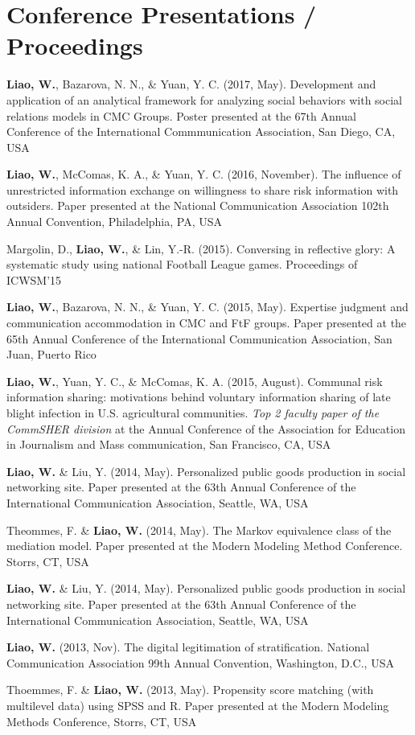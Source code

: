 \documentclass[11pt, letterpaper]{article} %
\newcommand{\years}[1]{\leavevmode\marginnote{\scriptsize #1}} %
\begin{document}
\section*{Conference Presentations / Proceedings}
\begin{hangparas}{.25in}{1}

    \textbf{Liao, W.}, \years{2017} Bazarova, N. N., \& Yuan, Y. C. (2017, May). Development and application of an analytical framework for analyzing social behaviors with social relations models in CMC Groups. Poster presented at the 67th Annual Conference of the International Commmunication Association, San Diego, CA, USA

    \textbf{Liao, W.}, \years{2016} McComas, K. A., \& Yuan, Y. C. (2016, November). The influence of unrestricted information exchange on willingness to share risk information with outsiders. Paper presented at the National Communication Association 102th Annual Convention, Philadelphia, PA, USA

    Margolin, D., \years{2015} \textbf{Liao, W.}, \& Lin, Y.-R. (2015). Conversing in reflective glory: A systematic study using national Football League games. Proceedings of ICWSM’15

    \textbf{Liao, W.}, Bazarova, N. N., \& Yuan, Y. C. (2015, May). Expertise judgment and communication accommodation in CMC and FtF groups. Paper presented at the 65th Annual Conference of the International Communication Association, San Juan, Puerto Rico

    \textbf{Liao, W.}, Yuan, Y. C., \& McComas, K. A. (2015, August). Communal risk information sharing: motivations behind voluntary information sharing of late blight infection in U.S. agricultural communities. \textsl{Top 2 faculty paper of the CommSHER division} at the Annual Conference of the Association for Education in Journalism and Mass communication, San Francisco, CA, USA

    \textbf{Liao, W.} \years{2012-2014}\& Liu, Y. (2014, May). Personalized public goods production in social networking site. Paper presented at the 63th Annual Conference of the International Communication Association, Seattle, WA, USA

    Theommes, F. \& \textbf{Liao, W.} (2014, May). The Markov equivalence class of the mediation model. Paper presented at the Modern Modeling Method Conference. Storrs, CT, USA

    \textbf{Liao, W.} \& Liu, Y. (2014, May). Personalized public goods production in social networking site. Paper presented at the 63th Annual Conference of the International Communication Association, Seattle, WA, USA

    \textbf{Liao, W.} (2013, Nov). The digital legitimation of stratification. National Communication Association 99th Annual Convention, Washington, D.C., USA

    Thoemmes, F. \& \textbf{Liao, W.} (2013, May). Propensity score matching (with multilevel data) using SPSS and R. Paper presented at the Modern Modeling Methods Conference, Storrs, CT, USA

    \vspace{\parskip}
    
\end{hangparas}
\end{document}
